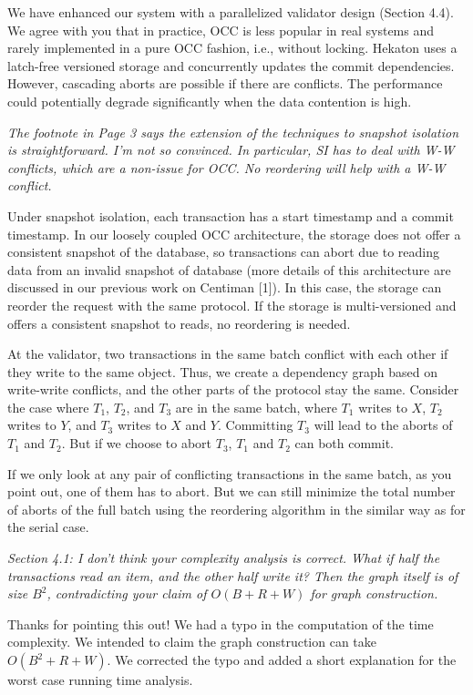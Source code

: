 \documentclass{article}
\begin{document}
We have enhanced our system with a parallelized validator design (Section 4.4). We agree with you that in practice, OCC is less popular in real systems and rarely implemented in a pure OCC fashion, i.e., without locking. Hekaton uses a latch-free versioned storage and concurrently updates the commit dependencies. However, cascading aborts are possible if there are conflicts. The performance could potentially degrade significantly when the data contention is high.

\emph{The footnote in Page 3 says the extension of the techniques to snapshot isolation is straightforward. I'm not so convinced. In particular, SI has to deal with W-W conflicts, which are a non-issue for OCC. No reordering will help with a W-W conflict.
}

Under snapshot isolation, each transaction has a start timestamp and a commit timestamp. In our loosely coupled OCC architecture, the storage does not offer a consistent snapshot of the database, so transactions can abort due to reading data from an invalid snapshot of database (more details of this architecture are discussed in our previous work on Centiman [1]). In this case, the storage can reorder the request with the same protocol. If the storage is multi-versioned and offers a consistent snapshot to reads, no reordering is needed.

At the validator, two transactions in the same batch conflict with each other if they write to the same object. Thus, we create a dependency graph based on write-write conflicts, and the other parts of the protocol stay the same. Consider the case where $T_1$, $T_2$, and $T_3$ are in the same batch, where $T_1$ writes to $X$, $T_2$ writes to $Y$, and $T_3$ writes to $X$ and $Y$. Committing $T_3$ will lead to the aborts of $T_1$ and $T_2$. But if we choose to abort $T_3$, $T_1$ and $T_2$ can both commit.

If we only look at any pair of conflicting transactions in the same batch, as you point out, one of them has to abort. But we can still minimize the total number of aborts of the full batch using the reordering algorithm in the similar way as for the serial case.

\emph{Section 4.1: I don't think your complexity analysis is correct. What if half the transactions read an item, and the other half write it? Then the graph itself is of size $B^2$, contradicting your claim of $O(B+R+W)$ for graph construction.}

Thanks for pointing this out! We had a typo in the computation of the time complexity. We intended to claim the graph construction can take $O(B^2+R+W)$. We corrected the typo and added a short explanation for the worst case running time analysis.
\end{document}
